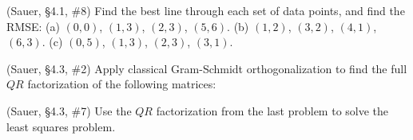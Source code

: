 \documentclass[12pt,fleqn]{exam}
\begin{document}
\begin{questions}
\question (Sauer, \S4.1, \#8) Find the best line through each set of data points, and find the RMSE: (a) $(0,0)$, $(1,3)$, $(2,3)$, $(5,6)$. (b) $(1,2)$, $(3,2)$, $(4,1)$, $(6,3)$. (c) $(0,5)$, $(1,3)$, $(2,3)$, $(3,1)$.

\question (Sauer, \S4.3, \#2) Apply classical Gram-Schmidt orthogonalization to find the full $QR$ factorization of the following matrices:


\question (Sauer, \S4.3, \#7) Use the $QR$ factorization from the last problem to solve the least squares problem.



\end{questions}
\end{document}
